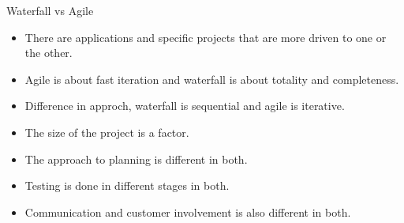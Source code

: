\begin{section}{Waterfall vs Agile}
    
    \begin{itemize}
        \item There are applications and specific projects that are more driven to one or the other.
        \item Agile is about fast iteration and waterfall is about totality and completeness.
        \item Difference in approch, waterfall is sequential and agile is iterative.
        \item The size of the project is a factor.
        \item The approach to planning is different in both.
        \item Testing is done in different stages in both.
        \item Communication and customer involvement is also different in both.
    
    \end{itemize}
    \end{section}